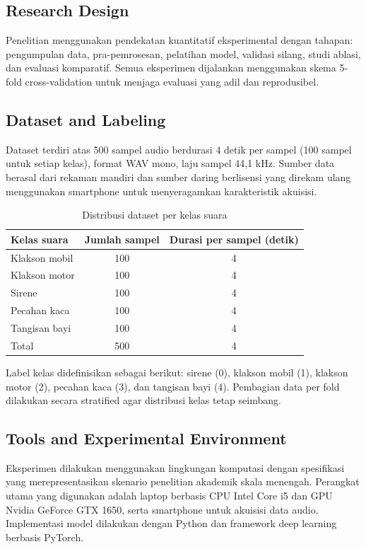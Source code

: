 \documentclass[10pt,a4paper]{jurnalvarian}
\let\LaTeXsubsection\subsection
\def\subsection{\setlength{\leftskip}{0.6cm}\LaTeXsubsection}
\begin{document}
\subsection{Research Design}
Penelitian menggunakan pendekatan kuantitatif eksperimental dengan tahapan: pengumpulan data, pra-pemrosesan, pelatihan model, validasi silang, studi ablasi, dan evaluasi komparatif. Semua eksperimen dijalankan menggunakan skema 5-fold cross-validation untuk menjaga evaluasi yang adil dan reprodusibel.

\subsection{Dataset and Labeling}
Dataset terdiri atas 500 sampel audio berdurasi 4 detik per sampel (100 sampel untuk setiap kelas), format WAV mono, laju sampel 44{,}1 kHz. Sumber data berasal dari rekaman mandiri dan sumber daring berlisensi yang direkam ulang menggunakan smartphone untuk menyeragamkan karakteristik akuisisi.

\begin{table}[H]
\centering
\fontsize{8pt}{10pt}\selectfont
\caption{Distribusi dataset per kelas suara}
\begin{tabular}{lcc}
\hline
Kelas suara & Jumlah sampel & Durasi per sampel (detik) \\
\hline
Klakson mobil & 100 & 4 \\
Klakson motor & 100 & 4 \\
Sirene & 100 & 4 \\
Pecahan kaca & 100 & 4 \\
Tangisan bayi & 100 & 4 \\
\hline
Total & 500 & 4 \\
\hline
\end{tabular}
\end{table}

Label kelas didefinisikan sebagai berikut: sirene (0), klakson mobil (1), klakson motor (2), pecahan kaca (3), dan tangisan bayi (4). Pembagian data per fold dilakukan secara stratified agar distribusi kelas tetap seimbang.

\subsection{Tools and Experimental Environment}
Eksperimen dilakukan menggunakan lingkungan komputasi dengan spesifikasi yang merepresentasikan skenario penelitian akademik skala menengah. Perangkat utama yang digunakan adalah laptop berbasis CPU Intel Core i5 dan GPU Nvidia GeForce GTX 1650, serta smartphone untuk akuisisi data audio. Implementasi model dilakukan dengan Python dan framework deep learning berbasis PyTorch.
\end{document}
